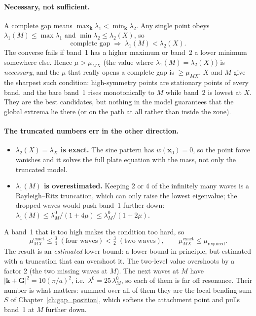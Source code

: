 \paragraph{Necessary, not sufficient.}
A complete gap means $\max_\mathbf{k}\lambda_1 < \min_\mathbf{k}\lambda_2$.
Any single point obeys $\lambda_1(M) \le \max\lambda_1$ and
$\min\lambda_2 \le \lambda_2(X)$, so
\begin{equation}
  \text{complete gap} \;\Longrightarrow\; \lambda_1(M) < \lambda_2(X) .
\end{equation}
The converse fails if band~1 has a higher maximum or band~2 a lower minimum
somewhere else. Hence $\mu > \mu_{MX}$ (the value where
$\lambda_1(M) = \lambda_2(X)$) is \emph{necessary}, and the $\mu$ that really
opens a complete gap is $\ge \mu_{MX}$. $X$ and $M$ give the sharpest such
condition: high-symmetry points are stationary points of every band, and the
bare band~1 rises monotonically to $M$ while band~2 is lowest at $X$. They are
the best candidates, but nothing in the model guarantees that the global
extrema lie there (or on the path at all rather than inside the zone).

\paragraph{The truncated numbers err in the other direction.}
\begin{itemize}
  \item \textbf{$\lambda_2(X) = \lambda_X$ is exact.} The sine pattern has
        $w(\mathbf{x}_0) = 0$, so the point force vanishes and it solves the
        full plate equation with the mass, not only the truncated model.
  \item \textbf{$\lambda_1(M)$ is overestimated.} Keeping 2 or 4 of the
        infinitely many waves is a Rayleigh--Ritz truncation, which can only
        raise the lowest eigenvalue; the dropped waves would push band~1
        further down:
        $\lambda_1(M) \le \lambda_M^0/(1+4\mu) \le \lambda_M^0/(1+2\mu)$.
\end{itemize}
A band~1 that is too high makes the condition too hard, so
\begin{equation}
  \mu_{MX}^\text{exact} \le \tfrac{3}{4} \;(\text{four waves}) < \tfrac{3}{2} \;(\text{two waves}),
  \qquad
  \mu_{MX}^\text{exact} \le \mu_\text{required} .
\end{equation}
The result is an \emph{estimated} lower bound: a lower bound in principle, but
estimated with a truncation that can overshoot it. The two-level value
overshoots by a factor $2$ (the two missing waves at $M$). The next waves at $M$
have $|\mathbf{k}+\mathbf{G}|^2 = 10(\pi/a)^2$, i.e.\ $\lambda^0 = 25\,\lambda_M^0$,
so each of them is far off resonance. Their number is what matters: summed over all
of them they are the local bending sum $S$ of Chapter~\ref{ch:gap_position}, which
softens the attachment point and pulls band~1 at $M$ further down.

